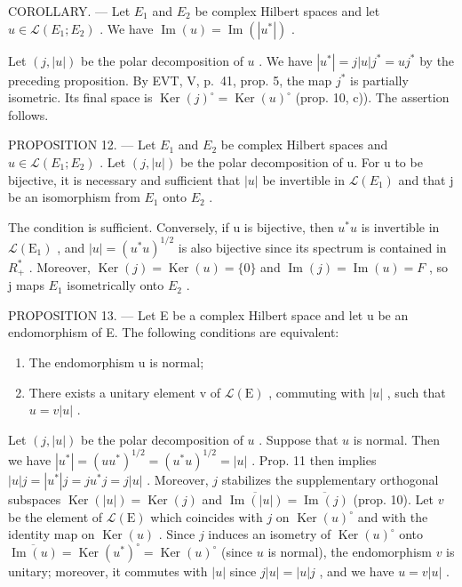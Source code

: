 COROLLARY. --- Let \(E_{1}\) and \(E_{2}\) be complex Hilbert spaces and let \(u \in \mathcal{L}(E_{1}; E_{2})\) . We have \(\operatorname{Im}(u) = \operatorname{Im}(|u^{*}|)\) .

Let \((j, |u|)\) be the polar decomposition of \(u\) . We have \(|u^{*}| = j|u|j^{*} = uj^{*}\) by the preceding proposition. By EVT, V, p.~41, prop. 5, the map \(j^{*}\) is partially isometric. Its final space is \(\operatorname{Ker}(j)^{\circ} = \operatorname{Ker}(u)^{\circ}\) (prop. 10, c)). The assertion follows.

PROPOSITION 12. — Let \(E_{1}\) and \(E_{2}\) be complex Hilbert spaces and \(u \in \mathcal{L}(E_{1}; E_{2})\) . Let \((j, |u|)\) be the polar decomposition of u. For u to be bijective, it is necessary and sufficient that \(|u|\) be invertible in \(\mathcal{L}(E_{1})\) and that j be an isomorphism from \(E_{1}\) onto \(E_{2}\) .

The condition is sufficient. Conversely, if u is bijective, then \(u^{*}u\) is invertible in \(\mathcal{L}(\mathrm{E}_{1})\) , and \(|u| = (u^{*}u)^{1/2}\) is also bijective since its spectrum is contained in \(R_{+}^{*}\) . Moreover, \(\operatorname{Ker}(j) = \operatorname{Ker}(u) = \{0\}\) and \(\operatorname{Im}(j) = \operatorname{Im}(u) = F\) , so j maps \(E_{1}\) isometrically onto \(E_{2}\) .

PROPOSITION 13. — Let E be a complex Hilbert space and let u be an endomorphism of E. The following conditions are equivalent:

\begin{enumerate}
\def\labelenumi{(\roman{enumi})}
\item
  The endomorphism u is normal;
\item
  There exists a unitary element v of \(\mathcal{L}(\mathrm{E})\) , commuting with \(|u|\) , such that \(u = v|u|\) .
\end{enumerate}

Let \((j,|u|)\) be the polar decomposition of \(u\) . Suppose that \(u\) is normal. Then we have \(|u^{*}| = (uu^{*})^{1/2} = (u^{*}u)^{1/2} = |u|\) . Prop. 11 then implies \(|u|j = |u^{*}|j = ju^{*}j = j|u|\) . Moreover, \(j\) stabilizes the supplementary orthogonal subspaces \(\operatorname{Ker}(|u|) = \operatorname{Ker}(j)\) and \(\overline{\operatorname{Im}(|u|)} = \overline{\operatorname{Im}(j)}\) (prop. 10). Let \(v\) be the element of \(\mathcal{L}(\mathrm{E})\) which coincides with \(j\) on \(\operatorname{Ker}(u)^{\circ}\) and with the identity map on \(\operatorname{Ker}(u)\) . Since \(j\) induces an isometry of \(\operatorname{Ker}(u)^{\circ}\) onto \(\overline{\operatorname{Im}(u)} = \operatorname{Ker}(u^{*})^{\circ} = \operatorname{Ker}(u)^{\circ}\) (since \(u\) is normal), the endomorphism \(v\) is unitary; moreover, it commutes with \(|u|\) since \(j|u| = |u|j\) , and we have \(u = v|u|\) .

